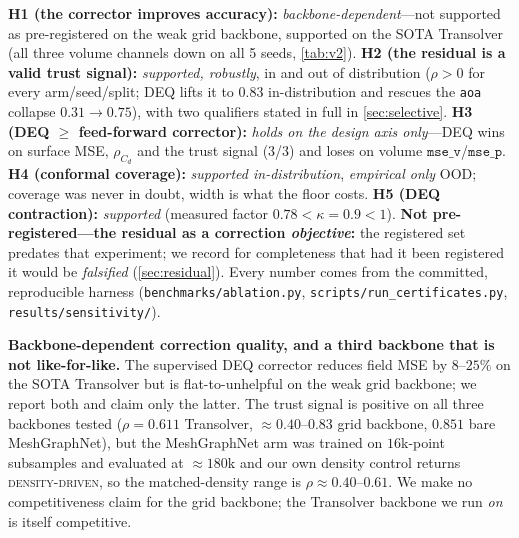 \textbf{H1 (the corrector improves accuracy):} \emph{backbone-dependent}---not supported
as pre-registered on the weak grid backbone, supported on the SOTA Transolver (all three
volume channels down on all 5 seeds, \autoref{tab:v2}). \textbf{H2 (the residual is a
valid trust signal):} \emph{supported, robustly}, in and out of distribution
($\rho>0$ for every arm/seed/split; DEQ lifts it to $0.83$ in-distribution and rescues the
\texttt{aoa} collapse $0.31\to0.75$), with two qualifiers stated in full in
\autoref{sec:selective}. \textbf{H3 (DEQ $\ge$ feed-forward corrector):} \emph{holds on the
design axis only}---DEQ wins on surface MSE, $\rho_{C_d}$ and the trust signal (3/3) and
loses on volume $\texttt{mse\_v}$/$\texttt{mse\_p}$. \textbf{H4 (conformal coverage):}
\emph{supported in-distribution}, \emph{empirical only} OOD; coverage was never in doubt,
width is what the floor costs. \textbf{H5 (DEQ contraction):} \emph{supported} (measured
factor $0.78 < \kappa = 0.9 < 1$). \textbf{Not pre-registered---the residual as a
correction \emph{objective}:} the registered set predates that experiment; we record for
completeness that had it been registered it would be \emph{falsified}
(\autoref{sec:residual}). Every number comes from the committed, reproducible harness
(\texttt{benchmarks/ablation.py}, \texttt{scripts/run\_certificates.py},
\texttt{results/sensitivity/}).



\item \textbf{Backbone-dependent correction quality, and a third backbone that is not
like-for-like.} The supervised DEQ corrector reduces field MSE by $8$--$25\%$ on the SOTA
Transolver but is flat-to-unhelpful on the weak grid backbone; we report both and claim
only the latter. The trust signal is positive on all three backbones tested
($\rho=0.611$ Transolver, $\approx 0.40$--$0.83$ grid backbone, $0.851$ bare MeshGraphNet),
but the MeshGraphNet arm was trained on $16$k-point subsamples and evaluated at
$\approx180$k and our own density control returns \textsc{density-driven}, so the
matched-density range is $\rho\approx0.40$--$0.61$. We make no competitiveness claim for the
grid backbone; the Transolver backbone we run \emph{on} is itself competitive.

